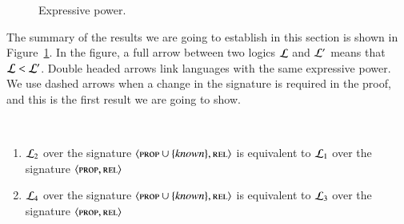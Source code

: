 \begin{figure}
\begin{center}
\end{center}
\caption{Expressive power.}\label{fig-expressivity}
\end{figure}

The summary of the results we are going to establish in this section
is shown in Figure~\ref{fig-expressivity}.  In the figure, a full arrow
between two logics $\mathcal{L}$ and $\mathcal{L}'$ means that $\mathcal{L} < \mathcal{L}'$. Double headed
arrows link languages with the same expressive power.  We use dashed
arrows when a change in the signature is required in the proof, and this is
the first result we are going to show.

\begin{thm} \
\begin{enumerate}
\item $\mathcal{L}_2$ over the signature $\langle \textsc{prop} \cup \{\mathit{known}\}, \textsc{rel} \rangle$ is equivalent to $\mathcal{L}_1$ over the signature $\langle \textsc{prop}, \textsc{rel} \rangle$
\item $\mathcal{L}_4$ over the signature $\langle \textsc{prop} \cup \{\mathit{known}\}, \textsc{rel} \rangle$ is equivalent to $\mathcal{L}_3$ over the signature $\langle \textsc{prop}, \textsc{rel} \rangle$
\end{enumerate}
\end{thm}

